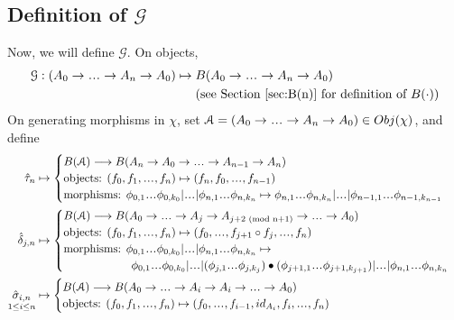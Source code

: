 \subsection{Definition of $\mathcal{G}$}
\label{sec:def_G}
Now, we will define $\mathcal{G}$. On objects, 
\begin{align*}
\mathcal{G}: (A_0 \to \smdots \to A_n \to A_0)
&\mapsto 
B(A_0 \to \smdots \to A_n \to A_0)\\
&\phantom{{}\mapsto{}}
\textrm{(see Section \ref{sec:B(n)} for 
definition of $B(\cdot)$)}
\end{align*}
On generating morphisms in $\chi$, set $\mathcal{A} = 
(A_0 \to \smdots \to A_n \to A_0) \in Obj(\chi)$, and 
define 
\begin{align*}
\hat{\tau}_n
  &\mapsto 
  \begin{cases}
  B(\mathcal{A}) \longrightarrow 
  B(A_n \to A_0 \to \smdots \to A_{n-1} \to A_n) \\
  \textrm{objects: } (f_0,f_1, \smdots, f_n) \mapsto 
  (f_n, f_0, \smdots, f_{n-1}) \\
  \textrm{morphisms: } \phi_{0,1}\smdots \phi_{0,k_0} | \smdots |
	\phi_{n,1}\smdots\phi_{n,k_n} \mapsto 
	\phi_{n,1}\smdots\phi_{n,k_n} | \smdots |
	\phi_{n-1,1}\smdots\phi_{n-1,k_{n-1}}
  \end{cases}\\	
%
\hat{\delta}_{j,n}
  &\mapsto 
  \begin{cases}
  B(\mathcal{A}) \longrightarrow 
  B(A_0 \to \smdots \to A_j\to A_{j+2 \textrm{ (mod n+1)}} 
      \to \smdots \to A_0) \\
  \textrm{objects: } (f_0,f_1, \smdots, f_n) \mapsto 
  (f_0, \smdots,f_{j+1}\circ f_j, \smdots, f_n) \\
  \textrm{morphisms: } \phi_{0,1}\smdots \phi_{0,k_0} | \smdots |
	\phi_{n,1}\smdots\phi_{n,k_n} \mapsto \\
  \phantom{{}morphisms: {}} 
	\phi_{0,1}\smdots \phi_{0,k_0} | \smdots |
	(\phi_{j,1}\smdots \phi_{j,k_j}) \bullet
	(\phi_{j+1,1}\smdots \phi_{j+1,k_{j+1}}) | \smdots |
	\phi_{n,1}\smdots\phi_{n,k_n} 
  \end{cases}\\
%
\underset{1 \leq i \leq n}{\hat{\sigma}_{i,n}}
  &\mapsto 
  \begin{cases}
  B(\mathcal{A}) \longrightarrow 
  B(A_0 \to \smdots \to A_i\to A_i
      \to \smdots \to A_0) \\
  \textrm{objects: } (f_0,f_1, \smdots, f_n) \mapsto 
  (f_0, \smdots,f_{i-1}, id_{A_i}, f_i, \smdots, f_n) \\

\end{cases}
\end{align*}
